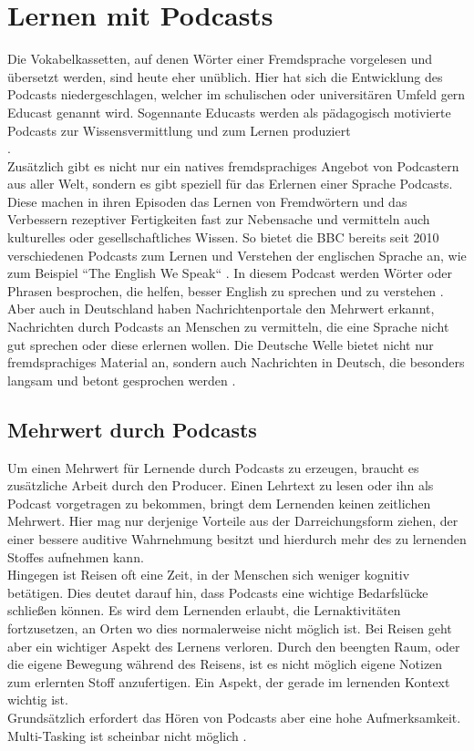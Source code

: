 \documentclass[11pt,a4paper]{scrreprt}
\begin{document}
\section{Lernen mit Podcasts}
Die Vokabelkassetten, auf denen Wörter einer Fremdsprache vorgelesen und übersetzt werden, sind heute eher unüblich. Hier hat sich die Entwicklung des Podcasts niedergeschlagen, welcher im schulischen oder universitären Umfeld gern Educast genannt wird. Sogennante Educasts werden als pädagogisch motivierte Podcasts zur Wissensvermittlung und zum Lernen produziert\\ \cite{MandySchiefner2008}. \\ 
Zusätzlich gibt es nicht nur ein natives fremdsprachiges Angebot von Podcastern aus aller Welt, sondern es gibt speziell für das Erlernen einer Sprache Podcasts. Diese machen in ihren Episoden das Lernen von Fremdwörtern und das Verbessern rezeptiver Fertigkeiten fast zur Nebensache und vermitteln auch kulturelles oder gesellschaftliches Wissen. So bietet die BBC bereits seit 2010 verschiedenen Podcasts zum Lernen und Verstehen der englischen Sprache an, wie zum Beispiel ``The English We Speak`` . In diesem Podcast werden Wörter oder Phrasen besprochen, die helfen, besser English zu sprechen und zu verstehen \cite{BBCRadio2010}. Aber auch in Deutschland haben Nachrichtenportale den Mehrwert erkannt, Nachrichten durch Podcasts an Menschen zu vermitteln, die eine Sprache nicht gut sprechen oder diese erlernen wollen. Die Deutsche Welle bietet nicht nur fremdsprachiges Material an, sondern auch Nachrichten in Deutsch, die besonders langsam und betont gesprochen werden \cite{Welle2018}.

\subsection{Mehrwert durch Podcasts}
Um einen Mehrwert für Lernende durch Podcasts zu erzeugen, braucht es zusätzliche Arbeit durch den Producer. Einen Lehrtext zu lesen oder ihn als Podcast vorgetragen zu bekommen, bringt dem Lernenden keinen zeitlichen Mehrwert. Hier mag nur derjenige Vorteile aus der Darreichungsform ziehen, der einer bessere auditive Wahrnehmung besitzt und hierdurch mehr des zu lernenden Stoffes aufnehmen kann.\\
Hingegen ist Reisen oft eine Zeit, in der Menschen sich weniger kognitiv betätigen. Dies deutet darauf hin, dass Podcasts eine wichtige Bedarfslücke schließen können. Es wird dem Lernenden erlaubt, die Lernaktivitäten fortzusetzen, an Orten wo dies normalerweise nicht möglich ist. Bei Reisen geht aber ein wichtiger Aspekt des Lernens verloren. Durch den beengten Raum, oder die eigene Bewegung während des Reisens, ist es nicht möglich eigene Notizen zum erlernten Stoff anzufertigen. Ein Aspekt, der gerade im lernenden Kontext wichtig ist.\\
Grundsätzlich erfordert das Hören von Podcasts aber eine hohe Aufmerksamkeit. Multi-Tasking ist scheinbar nicht möglich \cite{Evans2008}.
\end{document}
